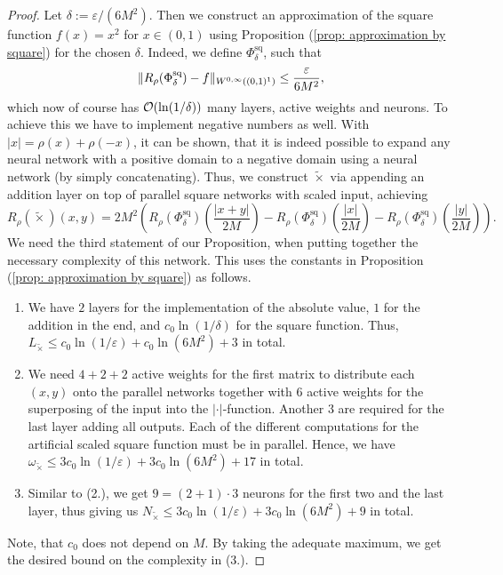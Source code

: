 \begin{proof}
    Let $\delta := \varepsilon/(6M^2)$. Then we construct
    an approximation of the square function $f(x) = x^2$ for $x \in (0, 1)$ 
    using Proposition (\ref{prop: approximation by square}) for the chosen $\delta$. Indeed, we define $\Phi^{\text{sq}}_\delta$,
    such that
    \begin{equation*}
        \snorm{R_\rho(\Phi^{\text{sq}}_\delta) - f}[0][\infty][1] \leq \frac{\varepsilon}{6M^2},
    \end{equation*}
    which now of course has $\mathcal{O}(\ln(1/\delta))$ many layers, active weights and neurons. To achieve 
    this we have to implement negative numbers as well. With $\vert x \vert = \rho(x) + \rho(-x)$, it can be shown,
    that it is indeed possible to expand any neural network with a positive domain to a negative domain using a neural network (by simply concatenating).
    Thus, we construct $\tilde{\times}$ via appending an 
    addition layer on top of parallel square networks with scaled input, achieving
    \begin{equation*}
        R_\rho(\tilde{\times})(x, y) = 2 M^2 \left( R_\rho(\Phi^\text{sq}_\delta) 
        \left( \frac{\vert x + y \vert}{2M} \right) - 
        R_\rho(\Phi^\text{sq}_\delta) \left( \frac{\vert x \vert}{2M} \right)
        - R_\rho(\Phi^\text{sq}_\delta) \left( \frac{\vert  y \vert}{2M} \right) \right).
    \end{equation*}
    We need the third statement of our Proposition, 
    when putting together the necessary complexity of this network.
    This uses the constants in Proposition (\ref{prop: approximation by square}) as follows.
    \begin{enumerate}
        \item We have $2$ layers for the implementation of the absolute value, $1$ for the addition in the end, 
        and $c_0 \ln(1 / \delta)$ for the square function. Thus,
        $L_{\tilde{\times}} \leq c_0\ln(1/\varepsilon) + c_0 \ln(6M^2) + 3$ in total.
        \item We need $4 + 2 + 2$ active weights for the first matrix to distribute each $(x,y)$ onto the parallel networks 
        together with $6$ active weights for the superposing of the input into the $\vert \cdot \vert$-function. 
        Another $3$ are required for the
        last layer adding all outputs. Each
        of the different computations for the artificial scaled square function must be in parallel. Hence, we have
        $\omega_{\tilde{\times}} \leq 3c_0\ln(1/\varepsilon) + 3c_0\ln(6M^2) + 17$ in total.
        \item Similar to (2.), we get $9 = (2 + 1) \cdot 3$ neurons for the first two and the last layer, thus giving us
        $N_{\tilde{\times}} \leq 3c_0\ln(1/\varepsilon) + 3c_0\ln(6M^2) + 9$ in total.
    \end{enumerate}
    Note, that $c_0$ does not depend on $M$. By taking the adequate maximum, we get the desired bound on the 
    complexity in (3.).


\end{proof}
